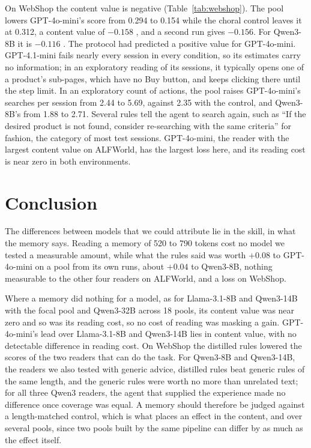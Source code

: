 On WebShop the content value is negative (Table~\ref{tab:webshop}). The pool lowers GPT-4o-mini's score
from 0.294 to 0.154 while the choral control leaves it at 0.312, a content value of $-0.158$
, and a second run gives $-0.156$. For Qwen3-8B it is $-0.116$ .
The protocol had predicted a positive value for GPT-4o-mini. GPT-4.1-mini fails nearly every session in
every condition, so its estimates carry no information; in an exploratory reading of its sessions, it
typically opens one of a product's sub-pages, which have no Buy button, and keeps clicking there until
the step limit. In an exploratory count of actions, the pool raises GPT-4o-mini's searches per session
from 2.44 to 5.69, against 2.35 with the control, and Qwen3-8B's from 1.88 to 2.71. Several rules tell
the agent to search again, such as ``If the desired product is not found, consider re-searching with
the same criteria'' for fashion, the category of most test sessions. GPT-4o-mini, the reader with the
largest content value on ALFWorld, has the largest loss here, and its reading cost is near zero in both
environments.

\section{Conclusion}
\label{sec:conclusion}

The differences between models that we could attribute lie in the skill, in what the memory says.
Reading a memory of 520 to 790 tokens cost no model we tested a measurable amount, while what the rules
said was worth $+0.08$ to GPT-4o-mini on a pool from its own runs, about $+0.04$ to Qwen3-8B, nothing
measurable to the other four readers on ALFWorld, and a loss on WebShop.

Where a memory did nothing for a model, as for Llama-3.1-8B and Qwen3-14B with the focal pool and
Qwen3-32B across 18 pools, its content value was near zero and so was its reading cost, so no cost of
reading was masking a gain. GPT-4o-mini's lead over Llama-3.1-8B and Qwen3-14B lies in content value,
with no detectable difference in reading cost. On WebShop the distilled rules lowered the scores of the
two readers that can do the task. For Qwen3-8B and Qwen3-14B, the readers we also tested with generic
advice, distilled rules beat generic rules of the same length, and the generic rules were worth no more
than unrelated text; for all three Qwen3 readers, the agent that supplied the experience made no
difference once coverage was equal. A memory should therefore be judged against a length-matched
control, which is what places an effect in the content, and over several pools, since two pools built by
the same pipeline can differ by as much as the effect itself.

